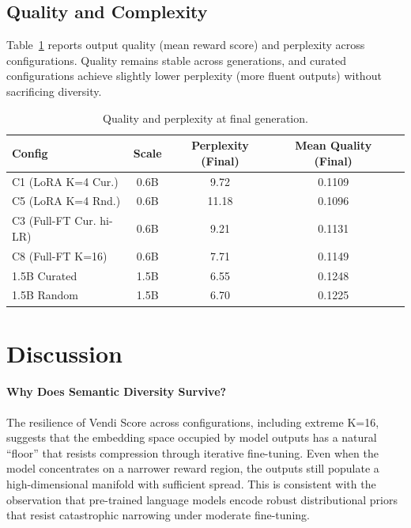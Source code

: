 \documentclass[11pt,a4paper]{article}
\begin{document}
\subsection{Quality and Complexity}

Table~\ref{tab:quality} reports output quality (mean reward score) and perplexity across configurations. Quality remains stable across generations, and curated configurations achieve slightly lower perplexity (more fluent outputs) without sacrificing diversity.

\begin{table}[t]
\centering
\caption{Quality and perplexity at final generation.}
\label{tab:quality}
\small
\begin{tabular}{@{}lcccc@{}}
\toprule
Config & Scale & Perplexity (Final) & Mean Quality (Final) \\
\midrule
C1 (LoRA K=4 Cur.) & 0.6B & 9.72 & 0.1109 \\
C5 (LoRA K=4 Rnd.) & 0.6B & 11.18 & 0.1096 \\
C3 (Full-FT Cur. hi-LR) & 0.6B & 9.21 & 0.1131 \\
C8 (Full-FT K=16) & 0.6B & 7.71 & 0.1149 \\
1.5B Curated & 1.5B & 6.55 & 0.1248 \\
1.5B Random & 1.5B & 6.70 & 0.1225 \\
\bottomrule
\end{tabular}
\end{table}

\section{Discussion}

\paragraph{Why Does Semantic Diversity Survive?}
The resilience of Vendi Score across configurations, including extreme K=16, suggests that the embedding space occupied by model outputs has a natural ``floor'' that resists compression through iterative fine-tuning. Even when the model concentrates on a narrower reward region, the outputs still populate a high-dimensional manifold with sufficient spread. This is consistent with the observation that pre-trained language models encode robust distributional priors that resist catastrophic narrowing under moderate fine-tuning.
\end{document}
